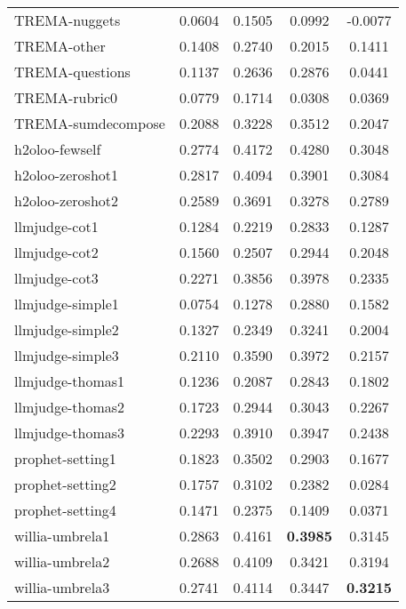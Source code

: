\begin{table}[]
{\begin{tabular}{lcccc}
    TREMA-nuggets           & 0.0604 & 0.1505 & 0.0992 & -0.0077 \\
    TREMA-other             & 0.1408 & 0.2740 & 0.2015 & 0.1411 \\
    TREMA-questions         & 0.1137 & 0.2636 & 0.2876 & 0.0441 \\
    TREMA-rubric0           & 0.0779 & 0.1714 & 0.0308 & 0.0369 \\
    TREMA-sumdecompose      & 0.2088 & 0.3228 & 0.3512 & 0.2047 \\
    h2oloo-fewself          & 0.2774 & 0.4172 & 0.4280 & 0.3048 \\
    h2oloo-zeroshot1        & 0.2817 & 0.4094 & 0.3901 & 0.3084 \\
    h2oloo-zeroshot2        & 0.2589 & 0.3691 & 0.3278 & 0.2789 \\
    llmjudge-cot1           & 0.1284 & 0.2219 & 0.2833 & 0.1287 \\
    llmjudge-cot2           & 0.1560 & 0.2507 & 0.2944 & 0.2048 \\
    llmjudge-cot3           & 0.2271 & 0.3856 & 0.3978 & 0.2335 \\
    llmjudge-simple1        & 0.0754 & 0.1278 & 0.2880 & 0.1582 \\
    llmjudge-simple2        & 0.1327 & 0.2349 & 0.3241 & 0.2004 \\
    llmjudge-simple3        & 0.2110 & 0.3590 & 0.3972 & 0.2157 \\
    llmjudge-thomas1        & 0.1236 & 0.2087 & 0.2843 & 0.1802 \\
    llmjudge-thomas2        & 0.1723 & 0.2944 & 0.3043 & 0.2267 \\
    llmjudge-thomas3        & 0.2293 & 0.3910 & 0.3947 & 0.2438 \\
    prophet-setting1        & 0.1823 & 0.3502 & 0.2903 & 0.1677 \\
    prophet-setting2        & 0.1757 & 0.3102 & 0.2382 & 0.0284 \\
    prophet-setting4        & 0.1471 & 0.2375 & 0.1409 & 0.0371 \\
    willia-umbrela1         & 0.2863 & 0.4161 & \textbf{0.3985} & 0.3145 \\
    willia-umbrela2         & 0.2688 & 0.4109 & 0.3421 & 0.3194 \\
    willia-umbrela3         & 0.2741 & 0.4114 & 0.3447 & \textbf{0.3215} \\
    \bottomrule
    \end{tabular}
    }
    
    \label{tab:kappa}
\end{table}